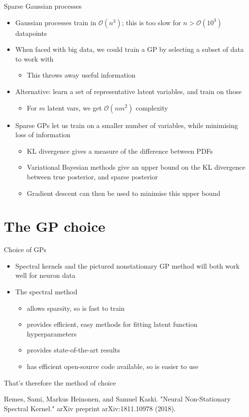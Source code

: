 \documentclass[presentation]{beamer}
\begin{document}
\begin{frame}[label={sec:org4542752}]{Sparse Gaussian processes}
\begin{itemize}
\item Gaussian processes train in \(\mathcal{O}(n^3)\); this is too slow for \(n>\mathcal{O}(10^3)\) datapoints
\item When faced with big data, we could train a GP by selecting a subset of data to work with
\begin{itemize}
\item This throws away useful information
\end{itemize}
\item Alternative: learn a set of representative latent variables, and train on those
\begin{itemize}
\item For \(m\) latent vars, we get \(\mathcal{O}(nm^2)\) complexity
\end{itemize}
\item Sparse GPs let us train on a smaller number of variables, while minimising loss of information
\begin{itemize}
\item KL divergence gives a measure of the difference between PDFs
\item Variational Bayesian methods give an upper bound on the KL divergence between true posterior, and sparse posterior
\item Gradient descent can then be used to minimise this upper bound
\end{itemize}
\end{itemize}
\end{frame}


\section{The GP choice}
\label{sec:orgc7fe757}
\begin{frame}[label={sec:org712d0cf}]{Choice of GPs}
\begin{itemize}
\item Spectral kernels and the pictured nonstationary GP method will both work well for neuron data
\item The spectral method
\begin{itemize}
\item allows sparsity, so is fast to train
\item provides efficient, easy methods for fitting latent function hyperparameters
\item provides state-of-the-art results
\item has efficient open-source code available, so is easier to use
\end{itemize}
\end{itemize}

That's therefore the method of choice

\vfill

Remes, Sami, Markus Heinonen, and Samuel Kaski. "Neural Non-Stationary Spectral Kernel." arXiv preprint arXiv:1811.10978 (2018).
\end{frame}
\end{document}
